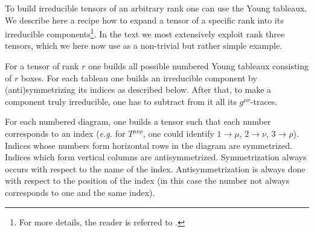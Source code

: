 \documentclass[12pt,preprintnumbers,nofootinbib]{revtex4}
\begin{document}
	To build irreducible tensors of an arbitrary rank one can use
	the Young tableaux. 
	We describe here a recipe how to expand a tensor of a specific
	rank into its irreducible components\footnote{
For more details, the reader is referred to \cite{Hamermesh}.}.
	In the text we most extensively exploit rank three tensors, which
	we here now use as a non-trivial but rather simple example.

	For a tensor of rank $ r $ one builds all possible numbered 
	Young tableaux consisting of $ r $ boxes.
	For each tableau one builds an irreducible component by 
	(anti)symmetrizing its indices as described below.
	After that, to make a component truly irreducible, one has to 
	subtract from it all its $ g^{\mu\nu} $-traces.

	For each numbered diagram, one builds a tensor such that
	each number corresponds to an index ({\it e.g.} 
	for $ T^{\mu\nu\rho} $, one could identify $ 1 \to \mu $,  
	$ 2 \to \nu $,  $ 3 \to \rho $).
	Indices whose numbers form horizontal rows in the diagram
	are symmetrized. 
	Indices which form vertical columns are antisymmetrized.
	Symmetrization always occurs with respect to the name
	of the index.
	Antisymmetrization is always done with respect to the
	position of the index (in this case the number not always
	corresponds to one and the same index).

%	
	
\end{document}

